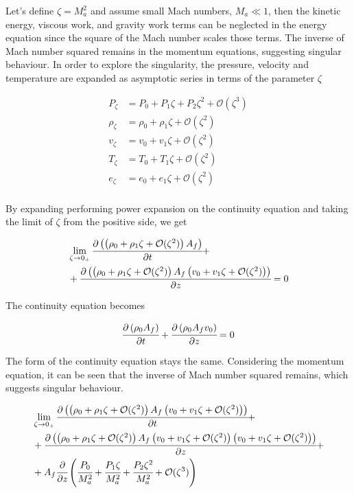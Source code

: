 \documentclass[../Article_Model_Parameters.tex]{subfiles}
\begin{document}
	Let's define $\zeta=M_a^2$ and assume small Mach numbers, $M_a \ll 1$, then the kinetic energy, viscous work, and gravity work terms can be neglected in the energy equation since the square of the Mach number scales those terms. The inverse of Mach number squared remains in the momentum equations, suggesting singular behaviour. In order to explore the singularity, the pressure, velocity and temperature are expanded as asymptotic series in terms of the parameter $\zeta$
	
	{\footnotesize
		\begin{align*}
			P_\zeta 	& = P_0 	+ P_1 \zeta		+ P_2 \zeta^2 		+ \mathcal{O}(\zeta^3) \\
			\rho_\zeta 	& = \rho_0	+ \rho_1 \zeta	+ \mathcal{O}(\zeta^2) \\
			v_\zeta 	& = v_0		+ v_1 \zeta 	+ \mathcal{O}(\zeta^2) \\
			T_\zeta 	& = T_0 	+ T_1 \zeta 	+ \mathcal{O}(\zeta^2) \\
			e_\zeta 	& = e_0 	+ e_1 \zeta 	+ \mathcal{O}(\zeta^2) \\
		\end{align*}
	}
	
	By expanding performing power expansion on the continuity equation and taking the limit of $\zeta$ from the positive side, we get
	
	{\footnotesize
		\begin{align*}
			& \lim_{\zeta \rightarrow 0_+} \cfrac{\partial \left( \left( \rho_0	+ \rho_1 \zeta	+ \mathcal{O}(\zeta^2) \right) A_f \right)}{\partial t} + \\
			&+ \cfrac{\partial \left(  \left(  \rho_0 + \rho_1 \zeta + \mathcal{O}(\zeta^2) \right) A_f \left( v_0	+v_1 \zeta 	+ \mathcal{O}(\zeta^2) \right) \right) }{\partial z} = 0
		\end{align*}
	}
	
	The continuity equation becomes
	
	{\footnotesize
		\begin{equation}
			\cfrac{\partial \left( \rho_0 A_f \right)}{\partial t} + \cfrac{\partial \left( \rho_0 A_f v_0 \right)}{\partial z} = 0
		\end{equation}
	}
	
	The form of the continuity equation stays the same. Considering the momentum equation, it can be seen that the inverse of Mach number squared remains, which suggests singular behaviour. 
	
	{\footnotesize
		\begin{align*}
			& \lim_{\zeta \rightarrow 0_+} \cfrac{\partial \left(  \left(  \rho_0 + \rho_1 \zeta + \mathcal{O}(\zeta^2) \right) A_f \left( v_0	+v_1 \zeta 	+ \mathcal{O}(\zeta^2) \right) \right) }{\partial t} + \\
			&+ \cfrac{\partial \left(  \left(  \rho_0	+ \rho_1 \zeta	+ \mathcal{O}(\zeta^2) \right) A_f \left( v_0	+ v_1 \zeta 	+ \mathcal{O}(\zeta^2) \right) \left( v_0	+ v_1 \zeta + \mathcal{O}(\zeta^2) \right) \right) }{\partial z} + \\
			&+ A_f \cfrac{\partial }{\partial z} \left(  \cfrac{P_0}{M_a^2}	+ \cfrac{P_1 \zeta}{M_a^2}	+ \cfrac{P_2 \zeta^2}{M_a^2} + \mathcal{O}(\zeta^3) \right)
		\end{align*}
	}
	
\end{document}
